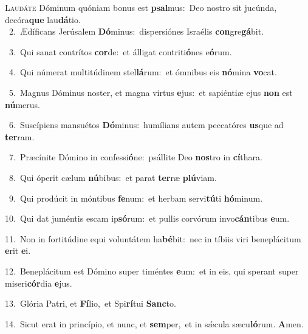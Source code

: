 \lettrine{\initial\textcolor{\initialcolor}{L}}{audáte} Dóminum quóniam bonus est \textbf{psal}\-mus:~\star Deo nostro sit jucúnda, decóra\textbf{que} lau\-\textbf{dá}\-tio.\\
{\numbfont\textcolor{\numbcolor}{~2.}}~Ædíficans Jerúsalem \textbf{Dó}\-minus:~\star dispersiónes Israélis \textbf{con}\-gre\-\textbf{gá}\-bit.\par
{\numbfont\textcolor{\numbcolor}{~3.}}~Qui sanat contrítos \textbf{cor}\-de:~\star et álligat contriti\-\textbf{ó}\-nes e\-\textbf{ó}\-rum.\par
{\numbfont\textcolor{\numbcolor}{~4.}}~Qui númerat multitúdinem stel\-\textbf{lá}\-rum:~\star et ómnibus eis \textbf{nó}\-mina \textbf{vo}\-cat.\par
{\numbfont\textcolor{\numbcolor}{~5.}}~Magnus Dóminus noster, et magna virtus \textbf{e}\-jus:~\star et sapiéntiæ ejus \textbf{non} est \textbf{nú}\-merus.\par
{\numbfont\textcolor{\numbcolor}{~6.}}~Suscípiens mansuétos \textbf{Dó}\-minus:~\star humílians autem peccatóres \textbf{us}\-que ad \textbf{ter}\-ram.\par
{\numbfont\textcolor{\numbcolor}{~7.}}~Præcínite Dómino in confessi\-\textbf{ó}\-ne:~\star psállite Deo \textbf{nos}\-tro in \textbf{cí}\-thara.\par
{\numbfont\textcolor{\numbcolor}{~8.}}~Qui óperit cælum \textbf{nú}\-bibus:~\star et parat \textbf{ter}\-ræ \textbf{plú}\-viam.\par
{\numbfont\textcolor{\numbcolor}{~9.}}~Qui prodúcit in móntibus \textbf{fe}\-num:~\star et herbam servi\-\textbf{tú}\-ti \textbf{hó}\-minum.\par
{\numbfont\textcolor{\numbcolor}{10.}}~Qui dat juméntis escam ip\-\textbf{só}\-rum:~\star et pullis corvórum invo\-\textbf{cán}\-tibus \textbf{e}\-um.\par
{\numbfont\textcolor{\numbcolor}{11.}}~Non in fortitúdine equi voluntátem ha\-\textbf{bé}\-bit:~\star nec in tíbiis viri beneplácitum \textbf{e}\-rit \textbf{e}\-i.\par
{\numbfont\textcolor{\numbcolor}{12.}}~Beneplácitum est Dómino super timéntes \textbf{e}\-um:~\star et in eis, qui sperant super miseri\-\textbf{cór}\-dia \textbf{e}\-jus.\par
{\numbfont\textcolor{\numbcolor}{13.}}~Glória Patri, et \textbf{Fí}\-lio,~\star et Spi\-\textbf{rí}\-tui \textbf{Sanc}\-to.\par
{\numbfont\textcolor{\numbcolor}{14.}}~Sicut erat in princípio, et nunc, et \textbf{sem}\-per,~\star et in sǽcula sæcu\-\textbf{ló}\-rum. \textbf{A}\-men.\par
